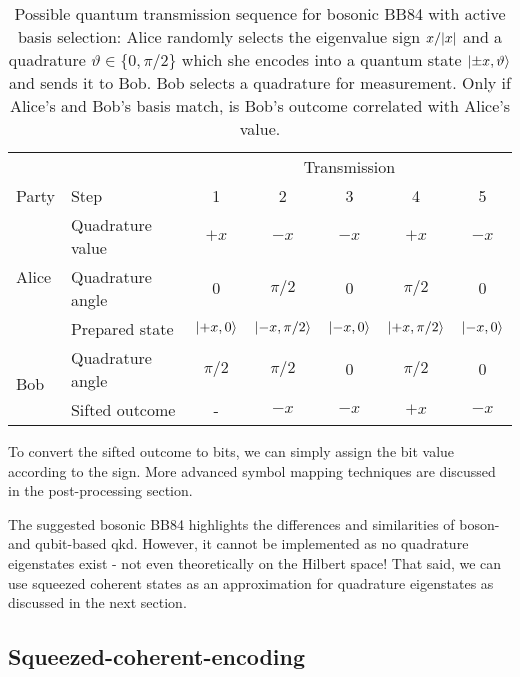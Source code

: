 \begin{table}[htb]
	\centering
	\begin{tabular}{llccccc}
		\toprule
		& & \multicolumn{5}{c}{Transmission} \\
		\cmidrule{3-7}
		Party & Step & 1 & 2 & 3 & 4 & 5 \\ 
		\midrule
		\multirow{3}{*}{Alice} & Quadrature value & $+x$ & $-x$ & $-x$ & $+x$ & $-x$ \\
		& Quadrature angle & $0$ & $\pi/2$ & $0$ & $\pi/2$ & $0$ \\
		& Prepared state & $\ket{+x,0}$ & $\ket{-x,\pi/2}$ & $\ket{-x,0}$ & $\ket{+x,\pi/2}$ & $\ket{-x,0}$ \\
		\cmidrule{1-2}
		\multirow{2}{*}{Bob} & Quadrature angle & $\pi/2$ & $\pi/2$ & $0$ & $\pi/2$ & $0$ \\
		& Sifted outcome & - & $-x$ & $-x$ & $+x$ & $-x$ \\
		\bottomrule
	\end{tabular}
	\caption{Possible quantum transmission sequence for bosonic BB84 with active basis selection: Alice randomly selects the eigenvalue sign $x/\abs{x}$ and a quadrature $\vartheta\in\{0,\pi/2\}$ which she encodes into a quantum state $\ket{\pm x,\vartheta}$ and sends it to Bob. Bob selects a quadrature for measurement. Only if Alice's and Bob's basis match, is Bob's outcome correlated with Alice's value.}\label{tab:boson_transmission_sequence}
\end{table}
To convert the sifted outcome to bits, we can simply assign the bit value according to the sign.
More advanced symbol mapping techniques are discussed in the post-processing section.

The suggested bosonic BB84 highlights the differences and similarities of boson- and qubit-based \gls{qkd}.
However, it cannot be implemented as no quadrature eigenstates exist - not even theoretically on the Hilbert space!
That said, we can use squeezed coherent states as an approximation for quadrature eigenstates as discussed in the next section.

\FloatBarrier
\subsection{Squeezed-coherent-encoding}

